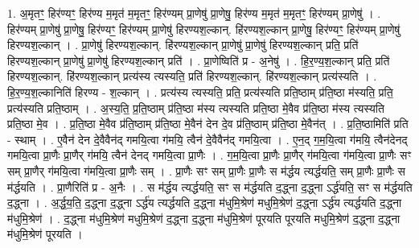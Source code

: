 \documentclass[17pt]{extarticle}
\begin{document}
1. अ॒मृतꣳ॒॒ हिर॑ण्यꣳ॒॒ हिर॑ण्य म॒मृत॑ म॒मृतꣳ॒॒ हिर॑ण्यम् प्रा॒णेषु॑ प्रा॒णेषु॒ हिर॑ण्य म॒मृत॑ म॒मृतꣳ॒॒ हिर॑ण्यम् प्रा॒णेषु॑ । . हिर॑ण्यम् प्रा॒णेषु॑ प्रा॒णेषु॒ हिर॑ण्यꣳ॒॒ हिर॑ण्यम् प्रा॒णेषु॑ हिरण्यश॒ल्कान्. हि॑रण्यश॒ल्कान् प्रा॒णेषु॒ हिर॑ण्यꣳ॒॒ हिर॑ण्यम् प्रा॒णेषु॑ हिरण्यश॒ल्कान् । . प्रा॒णेषु॑ हिरण्यश॒ल्कान्. हि॑रण्यश॒ल्कान् प्रा॒णेषु॑ प्रा॒णेषु॑ हिरण्यश॒ल्कान् प्रति॒ प्रति॑ हिरण्यश॒ल्कान् प्रा॒णेषु॑ प्रा॒णेषु॑ हिरण्यश॒ल्कान् प्रति॑ । . प्रा॒णेष्विति॑ प्र - अ॒नेषु॑ । . हि॒र॒ण्य॒श॒ल्कान् प्रति॒ प्रति॑ हिरण्यश॒ल्कान्. हि॑रण्यश॒ल्कान् प्रत्य॑स्य त्यस्यति॒ प्रति॑ हिरण्यश॒ल्कान्. हि॑रण्यश॒ल्कान् प्रत्य॑स्यति । . हि॒र॒ण्य॒श॒ल्कानिति॑ हिरण्य - श॒ल्कान् । . प्रत्य॑स्य त्यस्यति॒ प्रति॒ प्रत्य॑स्यति प्रति॒ष्ठाम् प्र॑ति॒ष्ठा म॑स्यति॒ प्रति॒ प्रत्य॑स्यति प्रति॒ष्ठाम् । . अ॒स्य॒ति॒ प्र॒ति॒ष्ठाम् प्र॑ति॒ष्ठा म॑स्य त्यस्यति प्रति॒ष्ठा मे॒वैव प्र॑ति॒ष्ठा म॑स्य त्यस्यति प्रति॒ष्ठा मे॒व । . प्र॒ति॒ष्ठा मे॒वैव प्र॑ति॒ष्ठाम् प्र॑ति॒ष्ठा मे॒वैन॑ देन दे॒व प्र॑ति॒ष्ठाम् प्र॑ति॒ष्ठा मे॒वैन॑त् । . प्र॒ति॒ष्ठामिति॑ प्रति - स्थाम् । . ए॒वैन॑ देन दे॒वैवैन॑द् गमयि॒त्वा ग॑मयि॒ त्वैन॑ दे॒वैवैन॑द् गमयि॒त्वा । . ए॒न॒द् ग॒म॒यि॒त्वा ग॑मयि॒ त्वैन॑देनद् गमयि॒त्वा प्रा॒णैः प्रा॒णैर् ग॑मयि॒ त्वैन॑ देनद् गमयि॒त्वा प्रा॒णैः । . ग॒म॒यि॒त्वा प्रा॒णैः प्रा॒णैर् ग॑मयि॒त्वा ग॑मयि॒त्वा प्रा॒णैः सꣳ सम् प्रा॒णैर् ग॑मयि॒त्वा ग॑मयि॒त्वा प्रा॒णैः सम् । . प्रा॒णैः सꣳ सम् प्रा॒णैः प्रा॒णैः स म॑र्द्धय त्यर्द्धयति॒ सम् प्रा॒णैः प्रा॒णैः स म॑र्द्धयति । . प्रा॒णैरिति॑ प्र - अ॒नैः । . स म॑र्द्धय त्यर्द्धयति॒ सꣳ स म॑र्द्धयति द॒द्ध्ना द॒द्ध्ना ऽर्द्ध॑यति॒ सꣳ स म॑र्द्धयति द॒द्ध्ना । . अ॒र्द्ध॒य॒ति॒ द॒द्ध्ना द॒द्ध्ना ऽर्द्ध॑य त्यर्द्धयति द॒द्ध्ना म॑धुमि॒श्रेण॑ मधुमि॒श्रेण॑ द॒द्ध्ना ऽर्द्ध॑य त्यर्द्धयति द॒द्ध्ना म॑धुमि॒श्रेण॑ । . द॒द्ध्ना म॑धुमि॒श्रेण॑ मधुमि॒श्रेण॑ द॒द्ध्ना द॒द्ध्ना म॑धुमि॒श्रेण॑ पूरयति पूरयति मधुमि॒श्रेण॑ द॒द्ध्ना द॒द्ध्ना म॑धुमि॒श्रेण॑ पूरयति । \newline
\end{document}
